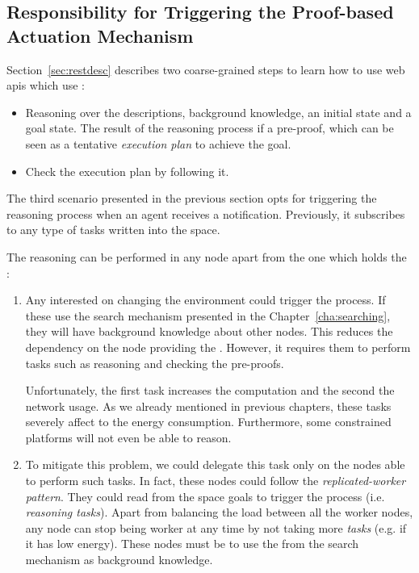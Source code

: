 \subsection{Responsibility for Triggering the Proof-based Actuation Mechanism}
\label{sec:responsible_proof}

Section~\ref{sec:restdesc} describes two coarse-grained steps to learn how to use web \acsp{api} which use \restdesc{}:
\begin{itemize}
  \item Reasoning over the descriptions, background knowledge, an initial state and a goal state.
        The result of the reasoning process if a pre-proof, which can be seen as a tentative \emph{execution plan} to achieve the goal.
  \item Check the execution plan by following it.
\end{itemize}


The third scenario presented in the previous section opts for triggering the reasoning process when an agent receives a notification.
Previously, it subscribes to any type of tasks written into the space.


The reasoning can be performed in any node apart from the one which holds the \Space{}:

\begin{enumerate}
  \item Any \consumer{} interested on changing the environment could trigger the process.
	If these \consumers{} use the search mechanism presented in the Chapter~\ref{cha:searching}, they will have background knowledge about other nodes.
	This reduces the dependency on the node providing the \coordspace{}.
	However, it requires them to perform tasks such as reasoning and checking the pre-proofs.
	
	Unfortunately, the first task increases the computation and the second the network usage.
	As we already mentioned in previous chapters, these tasks severely affect to the energy consumption.
	Furthermore, some constrained platforms will not even be able to reason.
	
  \item To mitigate this problem, we could delegate this task only on the nodes able to perform such tasks.
	In fact, these nodes could follow the \emph{replicated-worker pattern}.
	They could read from the space goals to trigger the process (i.e. \emph{reasoning tasks}).
	Apart from balancing the load between all the worker nodes, any node can stop being worker at any time by not taking more \emph{tasks} (e.g. if it has low energy).
	These nodes must be \consumers{} to use the \clues{} from the search mechanism as background knowledge.
\end{enumerate}


